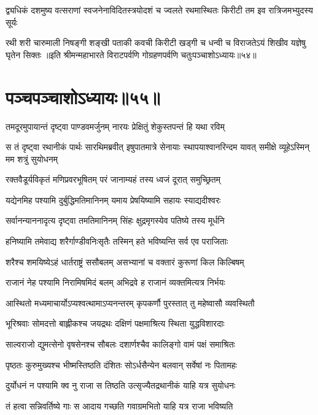 \fourlineindentedshloka
{द्व्यधिकं दशमुष्य वत्सराणां}
{स्वजनेनाविदितस्त्रयोदशं च}
{ज्वलते रथमास्थितः किरीटी}
{तम इव रात्रिजमभ्युदस्य सूर्यः}

\fourlineindentedshloka
{रथी शरी चारुमाली निषङ्गी}
{शङ्खी पताकी कवची किरीटी}
{खड्गी च धन्वी च विराजतेऽयं}
{शिखीव यज्ञेषु घृतेन सिक्तः}
॥इति श्रीमन्महाभारते विराटपर्वणि गोग्रहणपर्वणि चतुःपञ्चाशोऽध्यायः॥५४॥

\chapter{पञ्चपञ्चाशोऽध्यायः॥५५॥}

\twolineshloka
{तमदूरमुपायान्तं दृष्ट्वा पाण्डवमर्जुनम्}
{नारयः प्रेक्षितुं शेकुस्तपन्तं हि यथा रविम्}


\threelineshloka
{स तं दृष्ट्वा रथानीकं पार्थः सारथिमब्रवीत्}
{इषुपातमात्रे सेनायाः स्थापयाश्वानरिन्दम}
{यावत् समीक्षे व्यूहेऽस्मिन् मम शत्रुं सुयोधनम्}


\twolineshloka
{रक्तवैडूर्यविकृतं मणिप्रवरभूषितम्}
{परं जानाम्यहं तस्य ध्वजं दूरात् समुच्छ्रितम्}


\twolineshloka
{यद्येनमिह पश्यामि दुर्बुद्धिमतिमानिनम्}
{यमाय प्रेषयिष्यामि सहायः स्याद्यदीश्वरः}


\twolineshloka
{सर्वानन्याननादृत्य दृष्ट्वा तमतिमानिनम्}
{सिंहः क्षुद्रमृगस्येव पतिष्ये तस्य मूर्धनि}


\twolineshloka
{हनिष्यामि तमेवाद्य शरैर्गाण्डीवनिःसृतैः}
{तस्मिन् हते भविष्यन्ति सर्व एव पराजिताः}


\twolineshloka
{शरैश्च शमयिष्येऽहं धार्तराष्ट्रं ससौबलम्}
{असभ्यानां च वक्तारं कुरूणां किल किल्बिषम्}


\twolineshloka
{राजानं नेह पश्यामि निरामिषमिदं बलम्}
{अभिद्रवे ह राजानं व्यक्तमित्यत्र निर्भयः}


\twolineshloka
{आस्थितो मध्यमाचार्योऽप्यश्वत्थामाऽप्यनन्तरम्}
{कृपकर्णौ पुरस्तात् तु महेष्वासौ व्यवस्थितौ}


\twolineshloka
{भूरिश्रवाः सोमदत्तो बाह्लीकश्च जयद्रथः}
{दक्षिणं पक्षमाश्रित्य स्थिता युद्धविशारदाः}


\twolineshloka
{साल्वराजो द्युमत्सेनो वृषसेनश्च सौबलः}
{दशार्णश्चैव कालिङ्गो वामं पक्षं समाश्रितः}


\twolineshloka
{पृष्ठतः कुरुमुख्यश्च भीष्मस्तिष्ठति दंशितः}
{सोऽर्धसैन्येन बलवान् सर्वेषां नः पितामहः}


\twolineshloka
{दुर्योधनं न पश्यामि क्व नु राजा स तिष्ठति}
{उत्सृज्यैतद्रथानीकं याहि यत्र सुयोधनः}


\twolineshloka
{तं हत्वा सन्निवर्तिष्ये गाः स आदाय गच्छति}
{गवाग्रमभितो याहि यत्र राजा भविष्यति}


